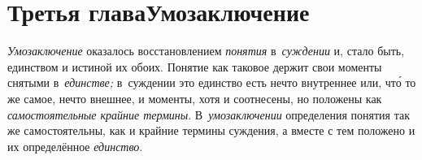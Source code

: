 \chapter[Третья глава Умозаключение]{Третья глава\newline Умозаключение}

{\em Умозаключение} оказалось восстановлением {\em понятия} в~{\em суждении}
и, стало быть, единством и истиной их обоих. Понятие как таковое держит свои
моменты снятыми в~{\em единстве;} в~суждении это единство есть нечто внутреннее
или, чт\'{о} то же самое, нечто внешнее, и моменты, хотя и соотнесены, но положены
как {\em самостоятельные крайние термины}. В~{\em умозаключении} определения
понятия так же самостоятельны, как и крайние термины суждения, а вместе с тем
положено и их определённое {\em единство}.

